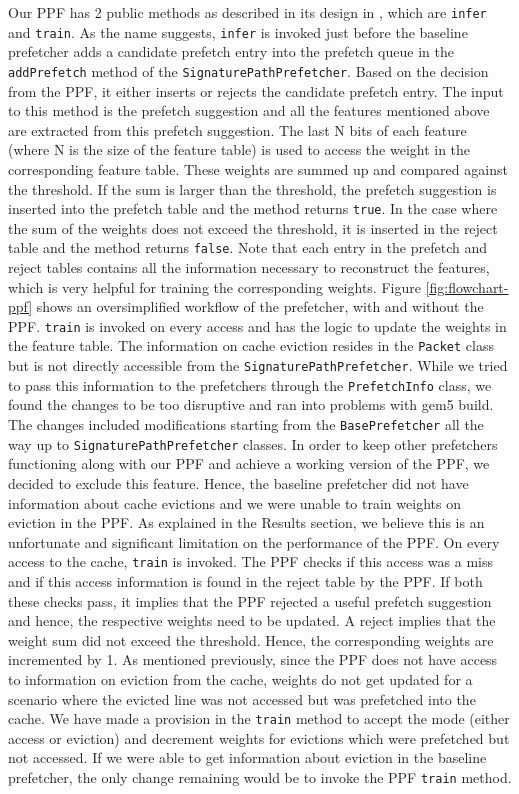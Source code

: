 \documentclass[10pt,conference]{IEEEtran}
\begin{document}
Our PPF has 2 public methods as described in its design in \cite{ppf}, which are \texttt{infer} and \texttt{train}. As the name suggests, \texttt{infer} is invoked just before the baseline prefetcher adds a candidate prefetch entry into the prefetch queue in the \texttt{addPrefetch} method of the \texttt{SignaturePathPrefetcher}. Based on the decision from the PPF, it either inserts or rejects the candidate prefetch entry. The input to this method is the prefetch suggestion and all the features mentioned above are extracted from this prefetch suggestion. The last N bits of each feature (where N is the size of the feature table) is used to access the weight in the corresponding feature table. These weights are summed up and compared against the threshold. If the sum is larger than the threshold, the prefetch suggestion is inserted into the prefetch table and the method returns \texttt{true}. In the case where the sum of the weights does not exceed the threshold, it is inserted in the reject table and the method returns \texttt{false}. Note that each entry in the prefetch and reject tables contains all the information necessary to reconstruct the features, which is very helpful for training the corresponding weights. Figure \ref{fig:flowchart-ppf} shows an oversimplified workflow of the prefetcher, with and without the PPF. \texttt{train} is invoked on every access and has the logic to update the weights in the feature table. The information on cache eviction resides in the \texttt{Packet} class but is not directly accessible from the \texttt{SignaturePathPrefetcher}. While we tried to pass this information to the prefetchers through the \texttt{PrefetchInfo} class, we found the changes to be too disruptive and ran into problems with gem5 build. The changes included modifications starting from the \texttt{BasePrefetcher} all the way up to \texttt{SignaturePathPrefetcher} classes. In order to keep other prefetchers functioning along with our PPF and achieve a working version of the PPF, we decided to exclude this feature. Hence, the baseline prefetcher did not have information about cache evictions and we were unable to train weights on eviction in the PPF. As explained in the Results section, we believe this is an unfortunate and significant limitation on the performance of the PPF. On every access to the cache, \texttt{train} is invoked. The PPF checks if this access was a miss and if this access information is found in the reject table by the PPF. If both these checks pass, it implies that the PPF rejected a useful prefetch suggestion and hence, the respective weights need to be updated. A reject implies that the weight sum did not exceed the threshold. Hence, the corresponding weights are incremented by 1. As mentioned previously, since the PPF does not have access to information on eviction from the cache, weights do not get updated for a scenario where the evicted line was not accessed but was prefetched into the cache. We have made a provision in the \texttt{train} method to accept the mode (either access or eviction) and decrement weights for evictions which were prefetched but not accessed. If we were able to get information about eviction in the baseline prefetcher, the only change remaining would be to invoke the PPF \texttt{train} method. 
\end{document}
